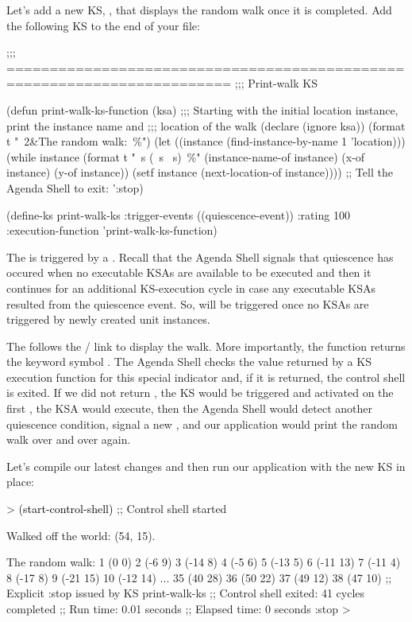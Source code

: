 \documentclass[10pt,twoside,english,pdftex]{article}
\begin{document}
%
%
%
%
Let's add a new KS, , that displays the random walk once
it is completed. Add the following KS to the end of your
 file:
%
\begin{example}
  ;;; ========================================================================
  ;;;   Print-walk KS

  (defun print-walk-ks-function (ksa)
    ;;; Starting with the initial location instance, print the instance name and
    ;;; location of the walk
    (declare (ignore ksa))
    (format t "~2\&The random walk:~\%")
      (let ((instance (find-instance-by-name 1 'location)))
      (while instance
        (format t "~s (~s ~s)~\%"
                (instance-name-of instance)
                (x-of instance)
                (y-of instance))
        (setf instance (next-location-of instance))))
    ;; Tell the Agenda Shell to exit:
    ':stop)

  (define-ks print-walk-ks
    :trigger-events ((quiescence-event))
    :rating 100
    :execution-function 'print-walk-ks-function)
\end{example}
%
The  is triggered by a .  Recall
that the Agenda Shell signals that quiescence has occured when no
executable KSAs are available to be executed and then it continues for an
additional KS-execution cycle in case any executable KSAs resulted from the
quiescence event.  So,  will be triggered once no
 KSAs are triggered by newly created  unit
instances.

The  follows the
/ link to display the walk.  More
importantly, the function returns the keyword symbol .  The Agenda
Shell checks the value returned by a KS execution function for this special
indicator and, if it is returned, the control shell is exited.  If we did not
return , the  KS would be triggered and
activated on the first , the KSA would execute, then
the Agenda Shell would detect another quiescence condition, signal a new
, and our application would print the random walk over
and over again.

Let's compile our latest changes and then run our application with the new
 KS in place:
%
\begin{example}\color{darkergray}%
  > \textcolor{black}{(start-control-shell)}
  ;; Control shell started

  Walked off the world: (54, 15).

  The random walk:
  1 (0 0)
  2 (-6 9)
  3 (-14 8)
  4 (-5 6)
  5 (-13 5)
  6 (-11 13)
  7 (-11 4)
  8 (-17 8)
  9 (-21 15)
  10 (-12 14)
       ...
  35 (40 28)
  36 (50 22)
  37 (49 12)
  38 (47 10)
  ;; Explicit :stop issued by KS print-walk-ks
  ;; Control shell exited: 41 cycles completed
  ;; Run time: 0.01 seconds
  ;; Elapsed time: 0 seconds
  :stop
  >
\end{example}
\end{document}
